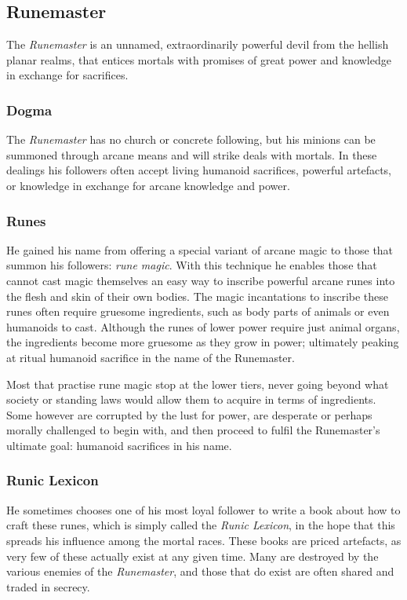 \subsection{Runemaster}

The \emph{Runemaster} is an unnamed, extraordinarily powerful devil from the
hellish planar realms, that entices mortals with promises of great power and
knowledge in exchange for sacrifices.

\subsubsection*{Dogma}

The \emph{Runemaster} has no church or concrete following, but his minions can
be summoned through arcane means and will strike deals with mortals. In these
dealings his followers often accept living humanoid sacrifices, powerful
artefacts, or knowledge in exchange for arcane knowledge and power.

\subsubsection*{Runes}

He gained his name from offering a special variant of arcane magic to those
that summon his followers: \emph{rune magic}. With this technique he enables
those that cannot cast magic themselves an easy way to inscribe powerful
arcane runes into the flesh and skin of their own bodies. The magic
incantations to inscribe these runes often require gruesome ingredients, such
as body parts of animals or even humanoids to cast. Although the runes of
lower power require just animal organs, the ingredients become more gruesome as
they grow in power; ultimately peaking at ritual humanoid sacrifice in the
name of the Runemaster.

Most that practise rune magic stop at the lower tiers, never going beyond what
society or standing laws would allow them to acquire in terms of
ingredients. Some however are corrupted by the lust for power, are desperate
or perhaps morally challenged to begin with, and then proceed to fulfil the
Runemaster's ultimate goal: humanoid sacrifices in his name.

\subsubsection*{Runic Lexicon}

He sometimes chooses one of his most loyal follower to write a book about how
to craft these runes, which is simply called the \emph{Runic Lexicon}, in the
hope that this spreads his influence among the mortal races. These books are
priced artefacts, as very few of these actually exist at any given time. Many
are destroyed by the various enemies of the \emph{Runemaster}, and those that
do exist are often shared and traded in secrecy.

